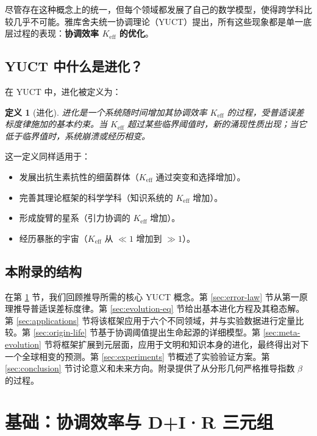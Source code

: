\documentclass[12pt,a4paper]{article}
\newtheorem{definition}[theorem]{定义}
\theoremstyle{remark}
\newcommand{\Keff}{K_{\mathrm{eff}}}
\begin{document}
	尽管存在这种概念上的统一，但每个领域都发展了自己的数学模型，使得跨学科比较几乎不可能。雅库舍夫统一协调理论（YUCT）提出，所有这些现象都是单一底层过程的表现：\textbf{协调效率 $\Keff$ 的优化}。
	
	\subsection{YUCT 中什么是进化？}
	
	在 YUCT 中，进化被定义为：
	
	\begin{definition}[进化]
		进化是一个系统随时间增加其协调效率 $\Keff$ 的过程，受普适误差标度律施加的基本约束。当 $\Keff$ 超过某些临界阈值时，新的涌现性质出现；当它低于临界值时，系统崩溃或经历相变。
	\end{definition}
	
	这一定义同样适用于：
	
	\begin{itemize}
		\item 发展出抗生素抗性的细菌群体（$\Keff$ 通过突变和选择增加）。
		\item 完善其理论框架的科学学科（知识系统的 $\Keff$ 增加）。
		\item 形成旋臂的星系（引力协调的 $\Keff$ 增加）。
		\item 经历暴胀的宇宙（$\Keff$ 从 $\ll 1$ 增加到 $\gg 1$）。
	\end{itemize}
	
	\subsection{本附录的结构}
	
	在第 \ref{sec:foundations} 节，我们回顾推导所需的核心 YUCT 概念。第 \ref{sec:error-law} 节从第一原理推导普适误差标度律。第 \ref{sec:evolution-eq} 节给出基本进化方程及其稳态解。第 \ref{sec:applications} 节将该框架应用于六个不同领域，并与实验数据进行定量比较。第 \ref{sec:origin-life} 节基于协调阈值提出生命起源的详细模型。第 \ref{sec:meta-evolution} 节将框架扩展到元层面，应用于文明和知识本身的进化，最终得出对下一个全球相变的预测。第 \ref{sec:experiments} 节概述了实验验证方案。第 \ref{sec:conclusion} 节讨论意义和未来方向。附录提供了从分形几何严格推导指数 $\beta$ 的过程。
	
	\section{基础：协调效率与 D+I·R 三元组}
	\label{sec:foundations}
	
\end{document}
